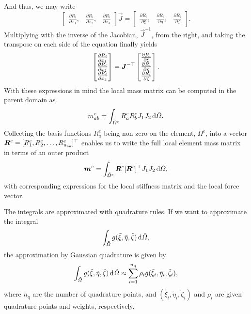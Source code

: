 And thus, we may write
\begin{equation}
	\begin{bmatrix}
		\frac{\partial R_i}{\partial x_1}, & \frac{\partial R_i}{\partial x_2},& \frac{\partial R_i}{\partial x_3}
	\end{bmatrix}\vec{J} = 
	\begin{bmatrix}
		\frac{\partial R_i}{\partial \xi}, & \frac{\partial R_i}{\partial \eta},& \frac{\partial R_i}{\partial \zeta}
	\end{bmatrix}.
\end{equation}
Multiplying with the inverse of the Jacobian, $\vec{J}^{-1}$, from the right, and taking the transpose on each side of the equation finally yields
\begin{equation}\label{Eq:basisFunsDerivativeRel}
	\begin{bmatrix}
		\frac{\partial R_i}{\partial x_1}\\
		\frac{\partial R_i}{\partial x_2}\\
		\frac{\partial R_i}{\partial x_3}
	\end{bmatrix} = 
	\vec{J}^{-\transpose}
	\begin{bmatrix}
		\frac{\partial R_i}{\partial \xi}\\
		\frac{\partial R_i}{\partial \eta}\\
		\frac{\partial R_i}{\partial \zeta}
	\end{bmatrix}.
\end{equation}
With these expressions in mind the local mass matrix can be computed in the parent domain as
\begin{equation*}
	m_{ab}^e = \int_{\tilde{\Omega}^e} R_a^e R_b^e J_1 J_2 \, \mathrm{d}\tilde{\Omega}.
\end{equation*}
Collecting the basis functions $R_a^e$ being non zero on the element, $\Omega^e$, into a vector ${\vec{R}^e =[R_1^e, R_2^e, \dots, R_{n_{\mathrm{en}}}^e]^\transpose}$ enables us to write the full local element mass matrix in terms of an outer product
\begin{equation*}
	\vec{m}^e = \int_{\tilde{\Omega}^e} \vec{R}^e [\vec{R}^e]^\transpose J_1 J_2 \idiff\tilde{\Omega},
\end{equation*}
with corresponding expressions for the local stiffness matrix and the local force vector. 

The integrals are approximated with quadrature rules. If we want to approximate the integral
\begin{equation*}
	\int_{\tilde{\Omega}} g(\tilde{\xi}, \tilde{\eta}, \tilde{\zeta}) \, \mathrm{d} \tilde{\Omega},
\end{equation*}
the approximation by Gaussian quadrature is given by
\begin{equation*}
	\int_{\tilde{\Omega}} g(\tilde{\xi}, \tilde{\eta}, \tilde{\zeta}) \, \mathrm{d} \tilde{\Omega} \approx \sum_{i=1}^{n_{\mathrm{q}}} \rho_i g(\tilde{\xi}_i, \tilde{\eta}_i, \tilde{\zeta}_i),
\end{equation*}
where $n_{\mathrm{q}}$ are the number of quadrature points, and $(\tilde{\xi}_i, \tilde{\eta}_i, \tilde{\zeta}_i)$ and $\rho_i$ are given quadrature points and weights, respectively.

